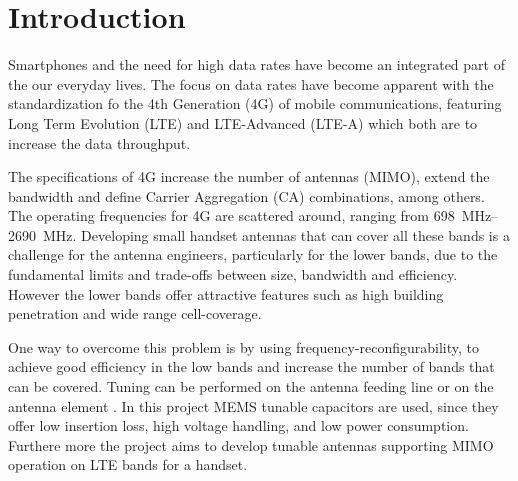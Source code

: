 \chapter{Introduction}
\label{cha:intro}
Smartphones and the need for high data rates have become an integrated part of the our everyday lives. The focus on data rates have become apparent with the standardization fo the 4th Generation (4G) of mobile communications, featuring Long Term Evolution (LTE) and LTE-Advanced (LTE-A) which both are to increase the data throughput. 

The specifications of 4G increase the number of antennas (MIMO), extend the bandwidth and define Carrier Aggregation (CA) combinations, among others. The operating frequencies for 4G are scattered around, ranging from \SIrange{698}{2690}{MHz}. Developing small handset antennas that can cover all these bands is a challenge for the antenna engineers, particularly for the lower bands, due to the fundamental limits and trade-offs between size, bandwidth and efficiency\cite{}. However the lower bands offer attractive features such as high building penetration and wide range cell-coverage. 

One way to overcome this problem is by using frequency-reconfigurability, to achieve good efficiency in the low bands and increase the number of bands that can be covered. Tuning can be performed on the antenna feeding line \cite{} \cite{} or on the antenna element \cite{} \cite{}. In this project MEMS tunable capacitors are used, since they offer low insertion loss, high voltage handling, and low power consumption\cite{}. Furthere more the project aims to develop tunable antennas supporting MIMO operation on LTE bands for a handset. 
